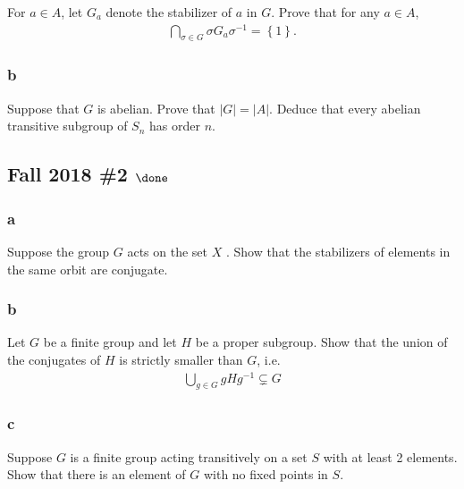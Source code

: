 For \(a \in A\), let \(G_a\) denote the stabilizer of \(a\) in \(G\).
Prove that for any \(a \in A\),
\begin{align*}
\bigcap_{\sigma\in G} \sigma G_a \sigma^{-1}= \left\{{1}\right\}
.\end{align*}

\hypertarget{b-16}{%
\subsubsection{b}\label{b-16}}

Suppose that \(G\) is abelian. Prove that \(|G| = |A|\). Deduce that
every abelian transitive subgroup of \(S_n\) has order \(n\).

\hypertarget{fall-2018-2-done}{%
\subsection{\texorpdfstring{Fall 2018 \#2
\(\done\)}{Fall 2018 \#2 \textbackslash done}}\label{fall-2018-2-done}}

\hypertarget{a-17}{%
\subsubsection{a}\label{a-17}}

Suppose the group \(G\) acts on the set \(X\) . Show that the
stabilizers of elements in the same orbit are conjugate.

\hypertarget{b-17}{%
\subsubsection{b}\label{b-17}}

Let \(G\) be a finite group and let \(H\) be a proper subgroup. Show
that the union of the conjugates of \(H\) is strictly smaller than
\(G\), i.e.
\begin{align*}
\bigcup_{g\in G} gHg^{-1}\subsetneq G
\end{align*}

\hypertarget{c-10}{%
\subsubsection{c}\label{c-10}}

Suppose \(G\) is a finite group acting transitively on a set \(S\) with
at least 2 elements. Show that there is an element of \(G\) with no
fixed points in \(S\).

